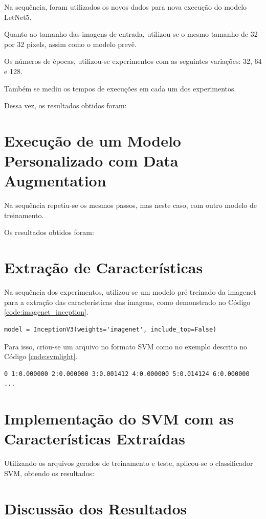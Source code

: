 \documentclass[12pt]{article}
\begin{document}
Na sequência, foram utilizados os novos dados para nova execução do modelo LetNet5.

Quanto ao tamanho das imagens de entrada, utilizou-se o mesmo tamanho de 32 por 32 pixels, assim como o modelo prevê.

Os números de épocas, utilizou-se experimentos com as seguintes variações: 32, 64 e 128.

Também se mediu os tempos de execuções em cada um dos experimentos.

Dessa vez, os resultados obtidos foram:

\section{Execução de um Modelo Personalizado com Data Augmentation}

Na sequência repetiu-se os mesmos passos, mas neste caso, com outro modelo de treinamento.

Os resultados obtidos foram:

\section{Extração de Características}

Na sequência dos experimentos, utilizou-se um modelo pré-treinado da imagenet para a extração das características das imagens, como demonstrado no Código \ref{code:imagenet_inception}.

\begin{lstlisting}[caption={ImageNet - InceptionV3},captionpos=b,frame=single,label={code:imagenet_inception}]
model = InceptionV3(weights='imagenet', include_top=False)
\end{lstlisting}

Para isso, criou-se um arquivo no formato SVM como no exemplo descrito no Código \ref{code:svmlight}.

\begin{lstlisting}[caption={Exemplo do Formato de Entrada},captionpos=b,frame=single,label={code:svmlight}]
0 1:0.000000 2:0.000000 3:0.001412 4:0.000000 5:0.014124 6:0.000000 ...
\end{lstlisting}

\section{Implementação do SVM com as Características Extraídas}

Utilizando os arquivos gerados de treinamento e teste, aplicou-se o classificador SVM, obtendo os resultados:

\section{Discussão dos Resultados}
\end{document}
